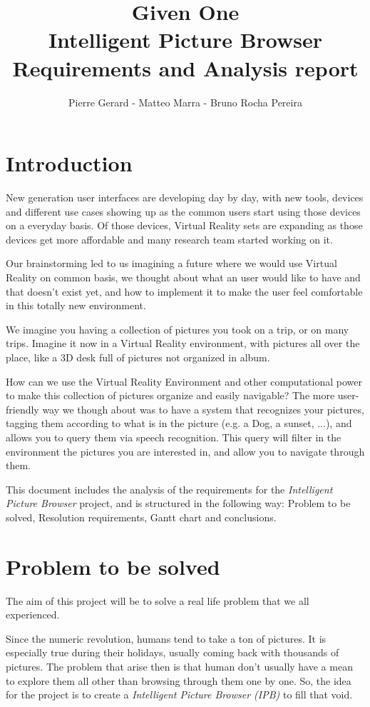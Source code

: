 \documentclass[11pt,a4paper]{article}
\author{Pierre Gerard - Matteo Marra - Bruno Rocha Pereira}
\title{Given One \\ Intelligent Picture Browser \\ Requirements and Analysis report}
\begin{document}
\maketitle
\section{Introduction}
New generation user interfaces are developing day by day, with new tools, devices and different use cases showing up as the common users start using those devices on a everyday basis.
Of those devices, Virtual Reality sets are expanding as those devices get more affordable and many research team started working on it. 

Our brainstorming led to us imagining a future where we would use Virtual Reality on common basis, we thought about what an user would like to have and that doesn't exist yet, and how to implement it to make the user feel comfortable in this totally new environment. 

We imagine you having a collection of pictures you took on a trip, or on many trips. Imagine it now in a Virtual Reality environment, with pictures all over the place, like a 3D desk full of pictures not organized in album.

How can we use the Virtual Reality Environment and other computational power to make this collection of pictures organize and easily navigable?
The more user-friendly way we though about was to have a system that recognizes your pictures, tagging them according to what is in the picture (e.g. a Dog, a sunset, ...), and allows you to query them via speech recognition. This query will filter in the environment the pictures you are interested in, and allow you to navigate through them.

This document includes the analysis of the requirements for the \textit{Intelligent Picture Browser} project, and is structured in the following way: Problem to be solved, Resolution requirements, Gantt chart and conclusions.

\section{Problem to be solved}

The aim of this project will be to solve a real life problem that we all experienced.

Since the numeric revolution, humans tend to take a ton of pictures. It is especially true during their holidays, usually coming back with thousands of pictures. The problem that arise then is that human don't usually have a mean to explore them all other than browsing through them one by one. So, the idea for the project is to create a \textit{Intelligent Picture Browser (IPB)} to fill that void.
 
\end{document}
